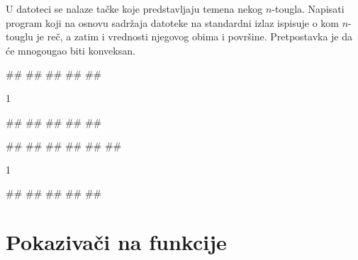 \begin{Exercise}[difficulty=1, label=2_26]
U datoteci  se nalaze tačke koje predstavljaju
temena nekog $n$-tougla. Napisati program koji na osnovu
sadržaja datoteke na standardni izlaz ispisuje o kom
$n$-touglu je reč, a zatim i vrednosti njegovog obima i
površine. Pretpostavka je da će mnogougao biti konveksan.

\begin{miditest}
\begin{upotreba}{1}
##
##
##
##
##
\end{upotreba}
\end{miditest}
\begin{miditest}
\begin{test2}{1}

#\naslovInt#
##
##
##
##
\end{test2}
\end{miditest}

\begin{miditest}
\begin{upotreba}{2}
##
##
##
##
##
##
\end{upotreba}
\end{miditest}
\begin{miditest}
\begin{test2}{1}

#\naslovInt#
##
##
##
##
\end{test2}
\end{miditest}
\end{Exercise}

\section{Pokazivači na funkcije}

